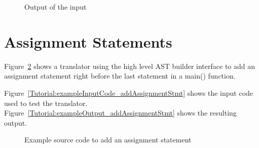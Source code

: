 \begin{figure}[!ht]
{\indent
{\mySmallFontSize
\begin{latexonly}
   
\end{latexonly}
\begin{htmlonly}
   
\end{htmlonly}

}
}
\caption{Output of the input}
\label{Tutorial:exampleOutput_AddExpression}
\end{figure}

\clearpage
\section{Assignment Statements}
Figure~\ref{Tutorial:exampleAddAssign} shows a translator
using the high level AST builder interface to add an assignment statement right
before the last statement in a main() function.  

   Figure~\ref{Tutorial:exampleInputCode_addAssignmentStmt} shows the
input code used to test the translator.
Figure~\ref{Tutorial:exampleOutput_addAssignmentStmt} shows the resulting output.

\begin{figure}[!ht]
{\indent
{\mySmallFontSize


\begin{latexonly}
   
\end{latexonly}

\begin{htmlonly}
   
\end{htmlonly}

}
}
\caption{Example source code to add an assignment statement}
\label{Tutorial:exampleAddAssign}
\end{figure}

